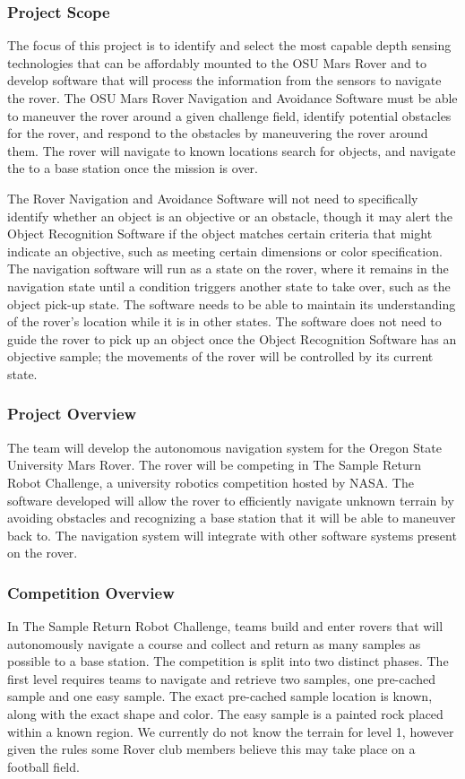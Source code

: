 \documentclass[10pt, oneside,onecolumn]{IEEEtran}
\begin{document}
\subsubsection{Project Scope}
The focus of this project is to identify and select the most capable depth sensing technologies that can be affordably mounted to the OSU Mars Rover and to develop software that will process the information from the sensors to navigate the rover. The OSU Mars Rover Navigation and Avoidance Software must be able to maneuver the rover around a given challenge field, identify potential obstacles for the rover, and respond to the obstacles by maneuvering the rover around them. The rover will navigate to known locations search for objects, and navigate the to a base station once the mission is over. 

The Rover Navigation and Avoidance Software will not need to specifically identify whether an object is an objective or an obstacle, though it may alert the Object Recognition Software if the object matches certain criteria that might indicate an objective, such as meeting certain dimensions or color specification. The navigation software will run as a state on the rover, where it remains in the navigation state until a condition triggers another state to take over, such as the object pick-up state. The software needs to be able to maintain its understanding of the rover's location while it is in other states. The software does not need to guide the rover to pick up an object once the Object Recognition Software has an objective sample; the movements of the rover will be controlled by its current state. 

\subsubsection{Project Overview}
The team will develop the autonomous navigation system for the Oregon State University Mars Rover. The rover will be competing in The Sample Return Robot Challenge, a university robotics competition hosted by NASA. The software developed will allow the rover to efficiently navigate unknown terrain by avoiding obstacles and recognizing a base station that it will be able to maneuver back to. The navigation system will integrate with other software systems present on the rover. 

\subsubsection{Competition Overview}
In The Sample Return Robot Challenge, teams build and enter rovers that will autonomously navigate a course and collect and return as many samples as possible to a base station. The competition is split into two distinct phases. 
The first level requires teams to navigate and retrieve two samples, one pre-cached sample and one easy sample. The exact pre-cached sample location is known, along with the exact shape and color. The easy sample is a painted rock placed within a known region. We currently do not know the terrain for level 1, however given the rules some Rover club members believe this may take place on a football field.
\end{document}
